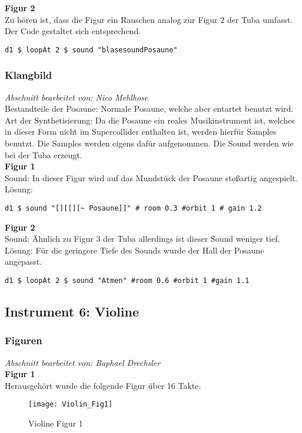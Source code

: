 \documentclass[
10pt, %
a4paper, %
oneside, %
headinclude,footinclude, %
BCOR5mm, %
]{scrartcl}
\begin{document}
\noindent\textbf{Figur 2}\\
Zu hören ist, dass die Figur ein Rauschen analog zur Figur 2 der Tuba umfasst. Der Code gestaltet sich entsprechend.
\begin{lstlisting}
d1 $ loopAt 2 $ sound "blasesoundPosaune"
\end{lstlisting}

\subsubsection{Klangbild}
\textit{Abschnitt bearbeitet von: Nico Mehlhose}\\

\noindent 
Bestandteile der Posaune: Normale Posaune, welche aber entartet benutzt wird.\\
Art der Synthetisierung: Da die Posaune ein reales Musikinstrument ist, welches in dieser Form nicht im Supercollider enthalten ist,
werden hierfür Samples benutzt. Die Samples werden eigens dafür aufgenommen. Die Sound werden wie bei der Tuba erzeugt.\\

\noindent\textbf{Figur 1}\\
 Sound: In dieser Figur wird auf das Mundstück der Posaune stoßartig angespielt.\\
Lösung:
\begin{lstlisting}
d1 $ sound "[][[][~ Posaune]]" # room 0.3 #orbit 1 # gain 1.2
\end{lstlisting}

\noindent\textbf{Figur 2}\\
Sound: Ähnlich zu Figur 3 der Tuba allerdings ist dieser Sound weniger tief.\\
Lösung: Für die geringere Tiefe des Sounds wurde der Hall der Posaune angepasst.
\begin{lstlisting}
d1 $ loopAt 2 $ sound "Atmen" #room 0.6 #orbit 1 #gain 1.1
\end{lstlisting}

\subsection{Instrument 6: Violine}
\subsubsection{Figuren}
\textit{Abschnitt bearbeitet von: Raphael Drechsler}\\

\noindent\textbf{Figur 1}\\
Herausgehört wurde die folgende Figur über 16 Takte.
\begin{figure}[h]
	\centering 
	\texttt{[image: Violin\_Fig1]} 
	\caption{Violine Figur 1}
\end{figure}
\end{document}
